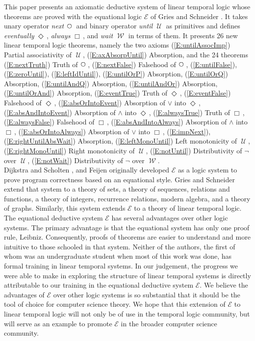 \documentclass[fleqn, leqno]{article}
\newcommand{\Until}{\;\mathcal{U}\;}
\newcommand{\Wait}{\;\mathcal{W}\;}
\newcommand{\Next}{\;\,\text{\raisebox{3.5pt}{\circle{6}}}}
\newcommand{\Event}{\Diamond\,}
\newcommand{\Always}{\Box\,}
\begin{document}
This paper presents an axiomatic deductive system of linear temporal logic whose theorems are proved with the equational
logic $\mathcal{E}$ of Gries and Schneider \cite{LADM}.
It takes unary operator \textit{next} $\Next$ and binary operator \textit{until} $\Until$ as primitives and defines
\textit{eventually} $\Event$, \textit{always} $\Always$, and \textit{wait} $\Wait$ in terms of them.
It presents 26 new linear temporal logic theorems, namely the two axioms
(\ref{E:untilAssocImp}) Partial associativity of $\Until$,
(\ref{E:axAbsorpUntil}) Absorption,
and the 24 theorems
(\ref{E:nextTruth}) Truth of $\Next$,
(\ref{E:nextFalse}) Falsehood of $\Next$,
(\ref{E:untilFalse}),
(\ref{E:zeroUntil}),
(\ref{E:leftIdUntil}),
(\ref{E:untilOrP}) Absorption,
(\ref{E:untilOrQ}) Absorption,
(\ref{E:untilAndQ}) Absorption,
(\ref{E:untilAndOr}) Absorption,
(\ref{E:untilOrAnd}) Absorption,
(\ref{E:eventTrue}) Truth of $\Event$,
(\ref{E:eventFalse}) Falsehood of $\Event$,
(\ref{E:absOrIntoEvent}) Absorption of $\lor$ into $\Event$,
(\ref{E:absAndIntoEvent}) Absorption of $\land$ into $\Event$,
(\ref{E:alwaysTrue}) Truth of $\Always$,
(\ref{E:alwaysFalse}) Falsehood of $\Always$,
(\ref{E:absAndIntoAlways}) Absorption of $\land$ into $\Always$,
(\ref{E:absOrIntoAlways}) Absorption of $\lor$ into $\Always$,
(\ref{E:impNext}),
(\ref{E:rightUntilAbsWait}) Absorption,
(\ref{E:leftMonoUntil}) Left monotonicity of $\Until$,
(\ref{E:rightMonoUntil}) Right monotonicity of $\Until$,
(\ref{E:notUntil}) Distributivity of $\neg$ over $\Until$,
(\ref{E:notWait}) Distributivity of $\neg$ over $\Wait$.\\

Dijkstra and Scholten \cite{DandS}, and Feijen \cite{Feij} originally developed $\mathcal{E}$ as a logic system to prove
program correctness based on an equational style.
Gries and Schneider extend that system to a theory of sets, a theory of sequences,
relations and functions, a theory of integers, recurrence relations, modern algebra, and a theory of graphs.
Similarly, this system extends $\mathcal{E}$ to a theory of linear temporal logic.\\

The equational deductive system $\mathcal{E}$ has several advantages over other logic systems.
The primary advantage is that the equational system has only one proof rule, Leibniz.
Consequently, proofs of theorems are easier to understand and more intuitive to those schooled in that system.
Neither of the authors, the first of whom was an undergraduate student when most of this work was done,
has formal training in linear temporal systems.
In our judgement, the progress we were able to make in exploring the structure of linear temporal systems
is directly attributable to our training in the equational deductive system $\mathcal{E}$.
We believe the advantages of $\mathcal{E}$ over other logic systems is so substantial that it should be the
tool of choice for computer science theory.
We hope that this extension of $\mathcal{E}$ to linear temporal logic will not only be of use in the
temporal logic community, but will serve as an example to promote $\mathcal{E}$ in the broader computer science community.



\end{document}
